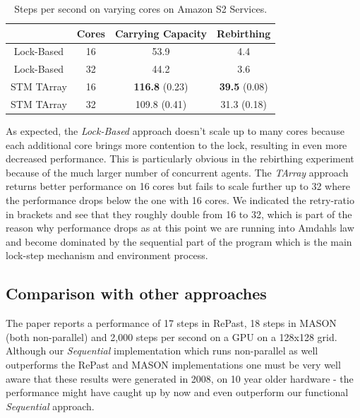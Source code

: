 \begin{table}
	\centering
  	\begin{tabular}{ c || c | c | c }
                   & Cores & Carrying Capacity & Rebirthing  \\ \hline \hline 
    	Lock-Based & 16    & 53.9              & 4.4         \\ \hline
    	Lock-Based & 32    & 44.2              & 3.6         \\ \hline \hline 
   		
   		STM TArray & 16    & \textbf{116.8} (0.23)      & \textbf{39.5} (0.08) \\ \hline
   		STM TArray & 32    & 109.8 (0.41)      & 31.3 (0.18) \\ \hline \hline 
   	\end{tabular}
  	
  	\caption{Steps per second on varying cores on Amazon S2 Services.}
	\label{tab:sug_varying_cores_amazon}
\end{table}

As expected, the \textit{Lock-Based} approach doesn't scale up to many cores because each additional core brings more contention to the lock, resulting in even more decreased performance. This is particularly obvious in the rebirthing experiment because of the much larger number of concurrent agents. The \textit{TArray} approach returns better performance on 16 cores but fails to scale further up to 32 where the performance drops below the one with 16 cores. We indicated the retry-ratio in brackets and see that they roughly double from 16 to 32, which is part of the reason why performance drops as at this point we are running into Amdahls law and become dominated by the sequential part of the program which is the main lock-step mechanism and environment process. 
%
%

\subsection{Comparison with other approaches}
The paper \cite{lysenko_framework_2008} reports a performance of 17 steps in RePast, 18 steps in MASON (both non-parallel) and 2,000 steps per second on a GPU on a 128x128 grid. Although our \textit{Sequential} implementation which runs non-parallel as well outperforms the RePast and MASON implementations one must be very well aware that these results were generated in 2008, on 10 year older hardware - the performance might have caught up by now and even outperform our functional \textit{Sequential} approach. 

